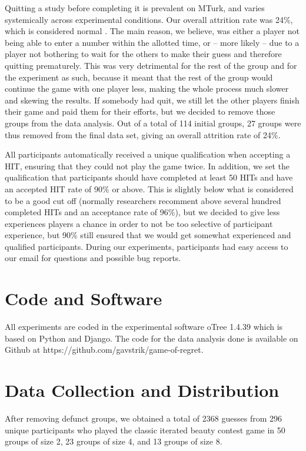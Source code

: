 Quitting a study before completing it is prevalent on MTurk, and varies systemically across experimental conditions. Our overall attrition rate was 24\%, which is considered normal \citep{ZhouFishbach16}. The main reason, we believe, was either a player not being able to enter a number within the allotted time, or – more likely – due to a player not bothering to wait for the others to make their guess and therefore quitting prematurely. This was very detrimental for the rest of the group and for the experiment as such, because it meant that the rest of the group would continue the game with one player less, making the whole process much slower and skewing the results. If somebody had quit, we still let the other players finish their game and paid them for their efforts, but we decided to remove those groups from the data analysis. Out of a total of 114 initial groups, 27 groups were thus removed from the final data set, giving an overall attrition rate of 24\%.

All participants automatically received a unique qualification when accepting a HIT, ensuring that they could not play the game twice. In addition, we set the qualification that participants should have completed at least 50 HITs and have an accepted HIT rate of 90\% or above. This is slightly below what is considered to be a good cut off (normally researchers recomment above several hundred completed HITs and an acceptance rate of 96\%), but we decided to give less experiences players a chance in order to not be too selective of participant experience, but 90\% still ensured that we would get somewhat experienced and qualified participants. During our experiments, participants had easy access to our email for questions and possible bug reports. 

\section{Code and Software}
All experiments are coded in the experimental software oTree 1.4.39 \citep{ChenSchongerWickens16} which is based on Python and Django. The code for the data analysis done is available on Github at https://github.com/gavstrik/game-of-regret.

\section{Data Collection and Distribution}
After removing defunct groups, we obtained a total of 2368 guesses from 296 unique participants who played the classic iterated beauty contest game in 50 groups of size 2, 23 groups of size 4, and 13 groups of size 8.

